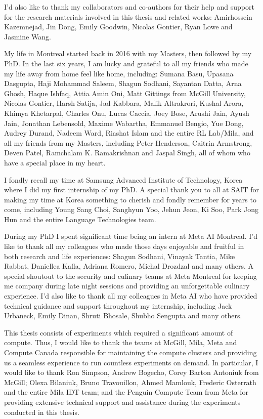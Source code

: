 \documentclass[letterpaper, 12pt]{report}
\begin{document}
I'd also like to thank my collaborators and co-authors for their help and support for the research materials involved in this thesis and related works: Amirhossein Kazemnejad, Jin Dong, Emily Goodwin, Nicolas Gontier, Ryan Lowe and Jasmine Wang.

My life in Montreal started back in 2016 with my Masters, then followed by my PhD. In the last six years, I am lucky and grateful to all my friends who made my life away from home feel like home, including: Sumana Basu, Upasana Dasgupta, Haji Mohammad Saleem, Shagun Sodhani, Sayantan Datta, Arna Ghosh, Haque Ishfaq, Attia Amin Oni, Matt Gittings from McGill University, Nicolas Gontier, Harsh Satija, Jad Kabbara, Malik Altrakrori, Kushal Arora, Khimya Khetarpal, Charles Onu, Lucas Caccia, Joey Bose, Arushi Jain, Ayush Jain, Jonathan Lebensold, Maxime Wabartha, Emmanuel Bengio, Yue Dong, Audrey Durand, Nadeem Ward, Riashat Islam and the entire RL Lab/Mila, and all my friends from my Masters, including Peter Henderson, Caitrin Armstrong, Deven Patel, Ramchalam K. Ramakrishnan and Jaspal Singh, all of whom who have a special place in my heart.

I fondly recall my time at Samsung Advanced Institute of Technology, Korea where I did my first internship of my PhD. A special thank you to all at SAIT for making my time at Korea something to cherish and fondly remember for years to come, including Young Sang Choi, Sanghyun Yoo, Jehun Jeon, Ki Soo, Park Jong Hun and the entire Language Technologies team.

During my PhD I spent significant time being an intern at Meta AI Montreal. I'd like to thank all my colleagues who made those days enjoyable and fruitful in both research and life experiences: Shagun Sodhani, Vinayak Tantia, Mike Rabbat, Daniellea Kafla, Adriana Romero, Michal Drozdzal and many others. A special shoutout to the security and culinary teams at Meta Montreal for keeping me company during late night sessions and providing an unforgettable culinary experience. I'd also like to thank all my colleagues in Meta AI who have provided technical guidance and support throughout my internship, including Jack Urbaneck, Emily Dinan, Shruti Bhosale, Shubho Sengupta and many others.

This thesis consists of experiments which required a significant amount of compute. Thus, I would like to thank the teams at McGill, Mila, Meta and Compute Canada responsible for maintaining the compute clusters and providing us a seamless experience to run countless experiments on demand. In particular, I would like to thank Ron Simpson, Andrew Bogecho, Corey Barton Antoniuk from McGill; Olexa Bilaniuk, Bruno Travouillon, Ahmed Mamlouk, Frederic Osterrath and the entire Mila IDT team; and the Penguin Compute Team from Meta for providing extensive technical support and assistance during the experiments conducted in this thesis.
\end{document}

